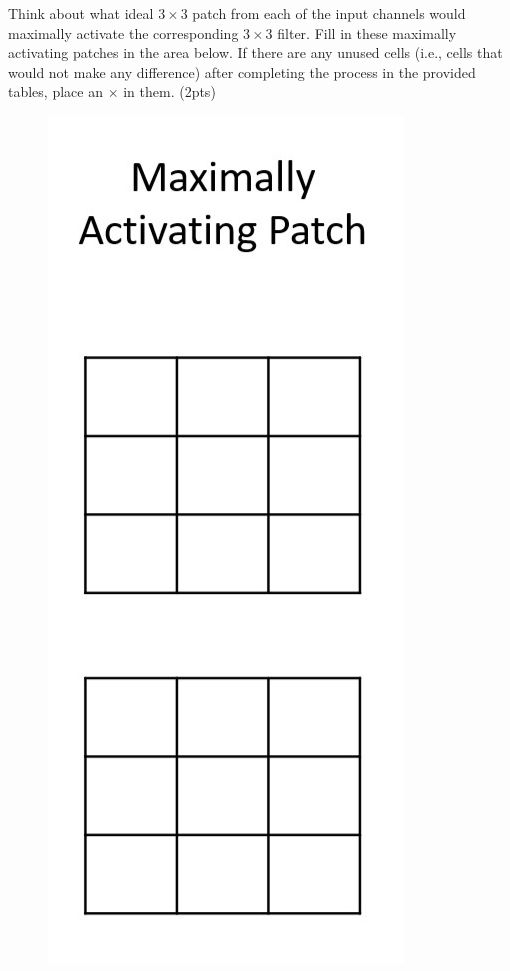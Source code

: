 Think about what ideal $3\times3$ patch from each of the input channels would maximally activate the corresponding $3\times3$ filter. Fill in these maximally activating patches in the area below. If there are any unused cells (i.e., cells that would not make any difference) after completing the process in the provided tables, place an $\times$ in them. (2pts)

\begin{figure}[H]
	\centering
	\includegraphics[width=.12\linewidth]{images/conv_question_blanks_2.png}
\end{figure}

\begin{tcolorbox}[title=Solution]
\end{tcolorbox}
